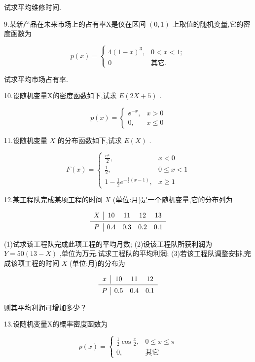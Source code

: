 试求平均维修时间.

9.某新产品在未来市场上的占有率X是仪在区间 $ (0,1) $ 上取值的随机变量,它的密度函数为

\[
p(x)=\left\{\begin{array}{ll}
{4(1-x)^{3},} & {0<x<1;} \\ {0} & {\text{其它.}}
\end{array}\right.
\]

试求平均市场占有率.

10.设随机变量X的密度函数如下,试求 $ E(2X+5) $ .

\[
p(x)=\left\{\begin{array}{ll}
{\ee ^{-x},} & {x>0} \\ 
{0,} & {x \leqslant 0}
\end{array}\right.
\]

11.设随机变量 $ X $ 的分布函数如下,试求 $ E(X) $ .

\[
F(x)=\left\{\begin{array}{ll}
{\frac{e^{x}}{2},} & {x<0} \\ {\frac{1}{2},} & {0 \leqslant x<1} \\
{1-\frac{1}{2} e^{-\frac{1}{2}(x-1)},} & {x \geqslant 1}
\end{array}\right.
\]

12.某工程队完成某项工程的时间 $ X $ (单位:月)是一个随机变量,它的分布列为

\[
\begin{array}{c|cccc}
X     & 10    & 11    & 12    & 13 \\\midrule
P     & 0.4   & 0.3   & 0.2   & 0.1 \\
\end{array}
\]

(1)试求该工程队完成此项工程的平均月数;
(2)设该工程队所获利润为 $ Y=50(13-X) $ ,单位为万元.试求工程队的平均利润;
(3)若该工程队调整安排,完成该项工程的时间 $ X $ (单位:月)的分布为

\[
\begin{array}{c|ccc}
{x} & {10} & {11} & {12} \\ \midrule
P & {0.5} & {0.4} & {0.1} \\
\end{array}
\]

则其平均利润可增加多少？

13.设随机变量X的概率密度函数为

\[
p(x)=\left\{\begin{array}{ll}
{\frac{1}{2} \cos \frac{x}{2},} & {0 \leqslant x \leqslant \pi} \\
{0,} & {\text{其它}}
\end{array}\right.
\]

